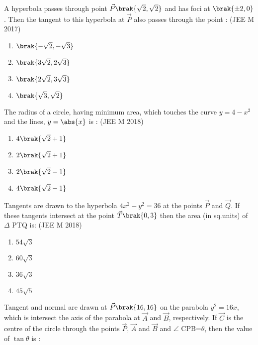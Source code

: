
\iffalse
  \title{CONIC SECTION}
  \author{MALAKALA BALA SUBRAHMANYA ARAVIND}
  \section{mcq-single}
\fi
   \item A hyperbola passes through point $\vec{P}\brak{\sqrt2,\sqrt2}$  and  has  foci  at $\brak{\pm2,0}$. Then  the  tangent  to  this  hyperbola at $\vec{P}$ also passes through the point :
      \hfill{(JEE M 2017)} 
	  \begin{enumerate}
    		\item  $\brak{-\sqrt2,-\sqrt3}$
    		\item  $\brak{3\sqrt2,2\sqrt3}$
    		\item  $\brak{2\sqrt2,3\sqrt3}$
    		\item  $\brak{\sqrt3,\sqrt2}$
	  \end{enumerate}
\item  The radius of a circle, having minimum area, which touches the curve $y=4-x^2$ and the lines, $y=\abs{x}$ is : 
   \hfill{(JEE M 2018)}
	  \begin{enumerate}
     		\item $4\brak{\sqrt2+1}$
     		\item $2\brak{\sqrt2+1}$
     		\item $2\brak{\sqrt2-1}$
     		\item $4\brak{\sqrt2-1}$
	  \end{enumerate}
\item Tangents are drawn to the hyperbola $4x^2-y^2=36$ at the points $\vec{P}$ and $\vec{Q}$. If  these tangents intersect  at the point $\vec{T}\brak{0,3}$ then the area (in sq.units) of $\Delta$ PTQ is:
     \hfill{(JEE M 2018)}
	  \begin{enumerate}
     		\item $54\sqrt3$
     		\item $60\sqrt3$
     		\item $36\sqrt3$ 
     		\item $45\sqrt5$
	  \end{enumerate}
\item Tangent and normal are drawn at $\vec{P}\brak{16,16}$ on the parabola $y^2=16x$,
which is intersect the axis of the parabola at $\vec{A}$ and $\vec{B}$, respectively. If $\vec{C}$ is the centre of the circle through the points $\vec{P}$, $\vec{A}$ and $\vec{B}$ and $\angle$ CPB=$\theta$, then the value of $\tan{\theta}$ is :
